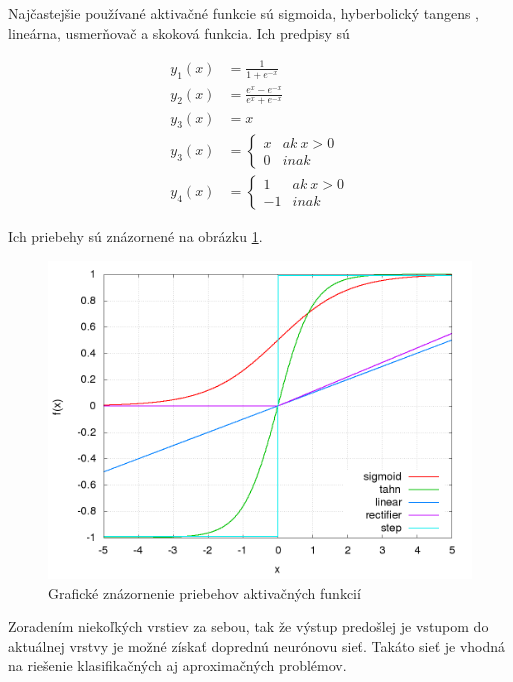 Najčastejšie používané aktivačné funkcie sú sigmoida, hyberbolický tangens , lineárna,
usmerňovač a skoková funkcia. Ich predpisy sú

\begin{align}
y_1(x) &= \frac{1}{1+e^{-x}} \\
y_2(x) &= \frac{e^{x} - e^{-x}}{e^{x} + e^{-x}} \\
y_3(x) &= x \\
y_3(x) &= \left\{
	\begin{array}{ll}
		x  & ak \ x > 0 \\
		0 & inak
	\end{array}
\right. \\
y_4(x) &= \left\{
	\begin{array}{ll}
		1  & ak \ x > 0 \\
		-1 & inak
	\end{array}
\right.
\label{eq:nn_transfer_function}
\end{align}

Ich priebehy sú znázornené na obrázku \ref{img:nn_functions}.

\begin{figure}[!htb]
\center
\includegraphics[scale=.4]{../pictures/nn_functions.png}
\caption{Grafické znázornenie priebehov aktivačných funkcií}
\label{img:nn_functions}
\end{figure}

Zoradením niekoľkých vrstiev za sebou, tak že výstup predošlej je vstupom do aktuálnej
vrstvy je možné získať doprednú neurónovu sieť. Takáto sieť je vhodná na riešenie klasifikačných
aj aproximačných problémov.

